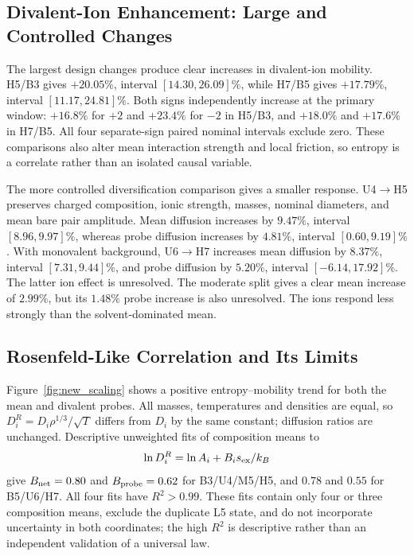 \subsection{Divalent-Ion Enhancement: Large and Controlled Changes}

The largest design changes produce clear increases in divalent-ion mobility. H5/B3 gives $+20.05\%$, interval $[14.30,26.09]\%$, while H7/B5 gives $+17.79\%$, interval $[11.17,24.81]\%$. Both signs independently increase at the primary window: $+16.8\%$ for $+2$ and $+23.4\%$ for $-2$ in H5/B3, and $+18.0\%$ and $+17.6\%$ in H7/B5. All four separate-sign paired nominal intervals exclude zero. These comparisons also alter mean interaction strength and local friction, so entropy is a correlate rather than an isolated causal variable.

The more controlled diversification comparison gives a smaller response. U4$\to$H5 preserves charged composition, ionic strength, masses, nominal diameters, and mean bare pair amplitude. Mean diffusion increases by $9.47\%$, interval $[8.96,9.97]\%$, whereas probe diffusion increases by $4.81\%$, interval $[0.60,9.19]\%$. With monovalent background, U6$\to$H7 increases mean diffusion by $8.37\%$, interval $[7.31,9.44]\%$, and probe diffusion by $5.20\%$, interval $[-6.14,17.92]\%$. The latter ion effect is unresolved. The moderate split gives a clear mean increase of $2.99\%$, but its $1.48\%$ probe increase is also unresolved. The ions respond less strongly than the solvent-dominated mean.

\subsection{Rosenfeld-Like Correlation and Its Limits}

Figure~\ref{fig:new_scaling} shows a positive entropy--mobility trend for both the mean and divalent probes. All masses, temperatures and densities are equal, so $D_i^R=D_i\rho^{1/3}/\sqrt{T}$ differs from $D_i$ by the same constant; diffusion ratios are unchanged. Descriptive unweighted fits of composition means to
\begin{equation}
\ln D_i^R=\ln A_i+B_i s_{\rm ex}/k_B
\label{eq:new_scaling}
\end{equation}
give $B_{\rm net}=0.80$ and $B_{\rm probe}=0.62$ for B3/U4/M5/H5, and $0.78$ and $0.55$ for B5/U6/H7. All four fits have $R^2>0.99$. These fits contain only four or three composition means, exclude the duplicate L5 state, and do not incorporate uncertainty in both coordinates; the high $R^2$ is descriptive rather than an independent validation of a universal law.

